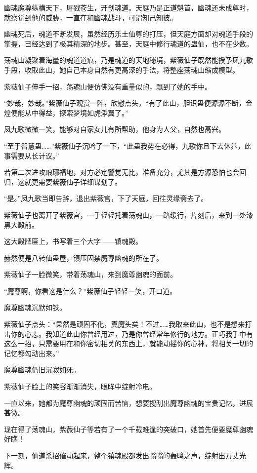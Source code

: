 \begin{this_body}
幽魂魔尊纵横天下，屠戮苍生，开创魂道。天庭乃是正道魁首，幽魂还未成尊时，就察觉到他的威胁，一直在和幽魂战斗，可谓知己知彼。

幽魂死后，魂道不断发展，虽然经历乐土仙尊的打压，但天庭方面却对魂道手段的掌握，已经达到了极其精深的地步。甚至，天庭中修行魂道的蛊仙，也不在少数。

荡魂山凝聚着海量的魂道道痕，乃是魂道的天地秘境，紫薇仙子既然能授予凤九歌手段，收取此山，她自己本身自然有更高深的手法，将整座荡魂山缩成模型。

紫薇仙子伸手一招，荡魂山便仿佛没有重量似的，飘到了她的手中。

“妙哉，妙哉。”紫薇仙子观赏一阵，欣慰点头，“有了此山，胆识蛊便源源不断，金煌便能从中得益，探索梦境如虎添翼了。”

凤九歌微微一笑，能够对自家女儿有所帮助，他身为人父，自然也高兴。

“至于智慧蛊……”紫薇仙子沉吟了一下，“此蛊我势在必得，九歌你且下去休养，此事需要从长计议。”

若第二次进攻琅琊福地，对方必定警觉无比，准备充分，尤其是方源恐怕也会回归，这就更需要紫薇仙子详细谋划了。

“是。”凤九歌当即告辞，退出紫薇宫，下了天庭，回往灵缘斋去了。

紫薇仙子也离开了紫薇宫，一手轻轻托着荡魂山，一路缓行，片刻后，来到一处漆黑大殿前。

这大殿牌匾上，书写着三个大字——镇魂殿。

赫然便是八转仙蛊屋，镇压囚禁魔尊幽魂的所在了。

紫薇仙子一脸微笑，带着荡魂山，来到魔尊幽魂的面前。

“魔尊啊，你看这是什么？”紫薇仙子轻轻一笑，开口道。

魔尊幽魂沉默如铁。

紫薇仙子点头：“果然是顽固不化，真魔头矣！不过……我取来此山，也不是想来打击你的心志。我知道此山你曾经用过，乃是你曾经常年修行的地方。正巧我手中有这么一招，只需要用在和你密切相关的东西上，就能动摇你的心神，将相关一切的记忆都勾动出来。”

魔尊幽魂仍旧沉寂如死。

紫薇仙子脸上的笑容渐渐消失，眼眸中绽射冷电。

一直以来，她都为魔尊幽魂的顽固而苦恼，想要搜刮出魔尊幽魂的宝贵记忆，进展甚微。

现在得了荡魂山，紫薇仙子等若有了一个千载难逢的突破口，她首先便要魔尊幽魂好瞧！

下一刻，仙道杀招催动起来，整个镇魂殿都发出嗡嗡的轰鸣之声，绽射出万丈光辉。


\end{this_body}
